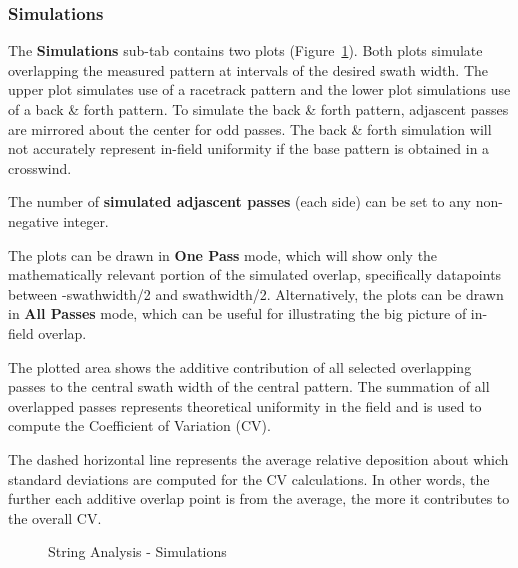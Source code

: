 \documentclass[10pt,letterpaper,titlepage]{article}
\begin{document}
    \subsubsection{Simulations}
    The \textbf{Simulations} sub-tab contains two plots (Figure~\ref{fig:string_simulations}). Both plots simulate overlapping the measured pattern at intervals of the desired swath width. The upper plot simulates use of a racetrack pattern and the lower plot simulations use of a back \& forth pattern. To simulate the back \& forth pattern, adjascent passes are mirrored about the center for odd passes. \color{red} The back \& forth simulation will not accurately represent in-field uniformity if the base pattern is obtained in a crosswind. \color{black}\par
    The number of \textbf{simulated adjascent passes} (each side) can be set to any non-negative integer.\par
    The plots can be drawn in \textbf{One Pass} mode, which will show only the mathematically relevant portion of the simulated overlap, specifically datapoints between -swathwidth/2 and swathwidth/2. Alternatively, the plots can be drawn in \textbf{All Passes} mode, which can be useful for illustrating the big picture of in-field overlap.\par
    The plotted area shows the additive contribution of all selected overlapping passes to the central swath width of the central pattern. The summation of all overlapped passes represents theoretical uniformity in the field and is used to compute the Coefficient of Variation (CV).\par
    The dashed horizontal line represents the average relative deposition about which standard deviations are computed for the CV calculations. In other words, the further each additive overlap point is from the average, the more it contributes to the overall CV.
    \begin{figure}[hb]
        \centering
        \caption{String Analysis - Simulations}
        \label{fig:string_simulations}
    \end{figure}
    \newpage
\end{document}
